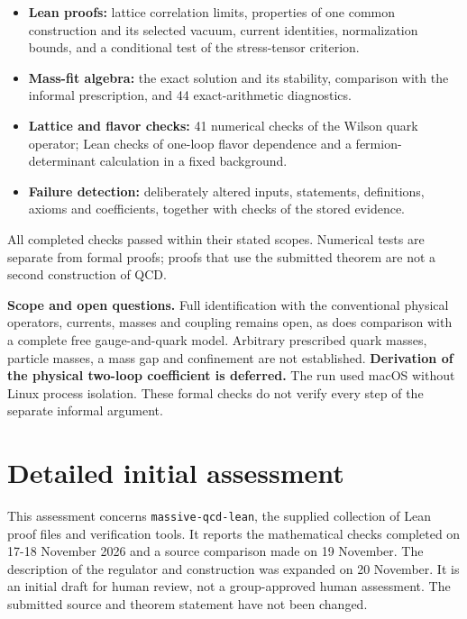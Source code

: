 \documentclass[
  11pt,
]{article}
\providecommand{\tightlist}{%
  \setlength{\itemsep}{0pt}\setlength{\parskip}{0pt}}
\begin{document}
\begin{itemize}
\tightlist
\item
  \textbf{Lean proofs:} lattice correlation limits, properties of one
  common construction and its selected vacuum, current identities,
  normalization bounds, and a conditional test of the stress-tensor
  criterion.
\item
  \textbf{Mass-fit algebra:} the exact solution and its stability,
  comparison with the informal prescription, and 44 exact-arithmetic
  diagnostics.
\item
  \textbf{Lattice and flavor checks:} 41 numerical checks of the Wilson
  quark operator; Lean checks of one-loop flavor dependence and a
  fermion-determinant calculation in a fixed background.
\item
  \textbf{Failure detection:} deliberately altered inputs, statements,
  definitions, axioms and coefficients, together with checks of the
  stored evidence.
\end{itemize}

All completed checks passed within their stated scopes. Numerical tests
are separate from formal proofs; proofs that use the submitted theorem
are not a second construction of QCD.

\textbf{Scope and open questions.} Full identification with the
conventional physical operators, currents, masses and coupling remains
open, as does comparison with a complete free gauge-and-quark model.
Arbitrary prescribed quark masses, particle masses, a mass gap and
confinement are not established. \textbf{Derivation of the physical
two-loop coefficient is deferred.} The run used macOS without Linux
process isolation. These formal checks do not verify every step of the
separate informal argument.

\clearpage

\section{Detailed initial assessment}\label{detailed-assessment}

This assessment concerns {\small \nolinkurl{massive-qcd-lean}}, the
supplied collection of Lean proof files and verification tools. It
reports the mathematical checks completed on 17-18 November 2026 and a
source comparison made on 19 November. The description of the regulator
and construction was expanded on 20 November. It is an initial draft for human review,
not a group-approved human assessment. The submitted source
and theorem statement have not been changed.
\end{document}
